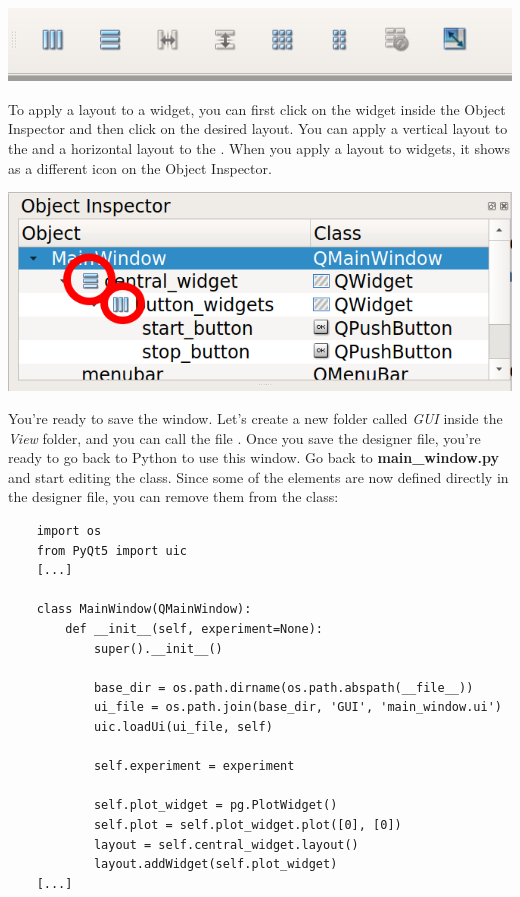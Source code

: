 \begin{center}
    \includegraphics[width=.4\textwidth]{images/Chapter_09/06_layouts.png}
\end{center}

To apply a layout to a widget, you can first click on the widget inside the Object Inspector and then click on the desired layout. You can apply a vertical layout to the  and a horizontal layout to the . When you apply a layout to widgets, it shows as a different icon on the Object Inspector.

\begin{center}
    \includegraphics[width=.4\textwidth]{images/Chapter_09/07_widgets_with_layouts.png}
\end{center}

You're ready to save the window. Let's create a new folder called \textit{GUI} inside the \emph{View} folder, and you can call the file . Once you save the designer file, you're ready to go back to Python to use this window. Go back to \textbf{main\_window.py} and start editing the  class. Since some of the elements are now defined directly in the designer file, you can remove them from the class:

\begin{verbatim}
    import os
    from PyQt5 import uic
    [...]

    class MainWindow(QMainWindow):
        def __init__(self, experiment=None):
            super().__init__()

            base_dir = os.path.dirname(os.path.abspath(__file__))
            ui_file = os.path.join(base_dir, 'GUI', 'main_window.ui')
            uic.loadUi(ui_file, self)

            self.experiment = experiment

            self.plot_widget = pg.PlotWidget()
            self.plot = self.plot_widget.plot([0], [0])
            layout = self.central_widget.layout()
            layout.addWidget(self.plot_widget)
    [...]
\end{verbatim}

